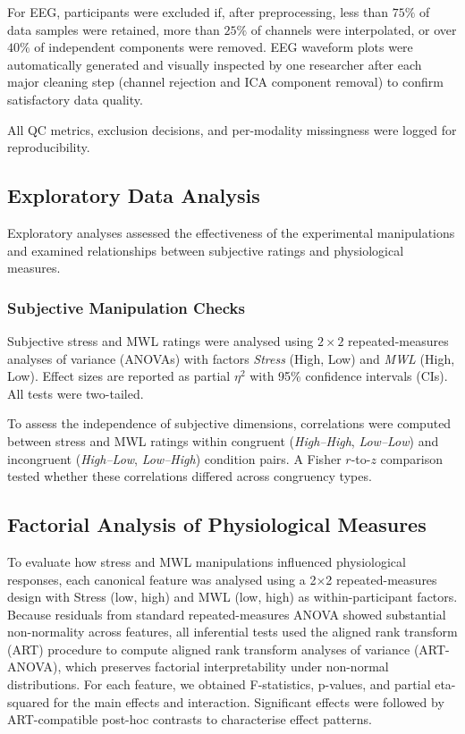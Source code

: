 \documentclass[lettersize,journal]{IEEEtran}
\begin{document}
For EEG, participants were excluded if, after preprocessing, less than $75\%$ of data samples were retained, more than $25\%$ of channels were interpolated, or over $40\%$ of independent components were removed. EEG waveform plots were automatically generated and visually inspected by one researcher after each major cleaning step (channel rejection and ICA component removal) to confirm satisfactory data quality.

All QC metrics, exclusion decisions, and per-modality missingness were logged for reproducibility.

\subsection{Exploratory Data Analysis}

Exploratory analyses assessed the effectiveness of the experimental manipulations and examined relationships between subjective ratings and physiological measures.

\subsubsection{Subjective Manipulation Checks}
Subjective stress and MWL ratings were analysed using $2\times2$ repeated-measures analyses of variance (ANOVAs) with factors \textit{Stress} (High, Low) and \textit{MWL} (High, Low). Effect sizes are reported as partial $\eta^2$ with 95\% confidence intervals (CIs). 
All tests were two-tailed. 

To assess the independence of subjective dimensions, correlations were computed between stress and MWL ratings within congruent (\textit{High–High}, \textit{Low–Low}) and incongruent (\textit{High–Low}, \textit{Low–High}) condition pairs. 
A Fisher \(r\)-to-\(z\) comparison tested whether these correlations differed across congruency types.

\subsection{Factorial Analysis of Physiological Measures}

To evaluate how stress and MWL manipulations influenced physiological responses, each canonical feature was analysed using a 2×2 repeated-measures design with Stress (low, high) and MWL (low, high) as within-participant factors. Because residuals from standard repeated-measures ANOVA showed substantial non-normality across features, all inferential tests used the aligned rank transform (ART) procedure to compute aligned rank transform analyses of variance (ART-ANOVA), which preserves factorial interpretability under non-normal distributions. For each feature, we obtained F-statistics, p-values, and partial eta-squared for the main effects and interaction. Significant effects were followed by ART-compatible post-hoc contrasts to characterise effect patterns.
\end{document}
